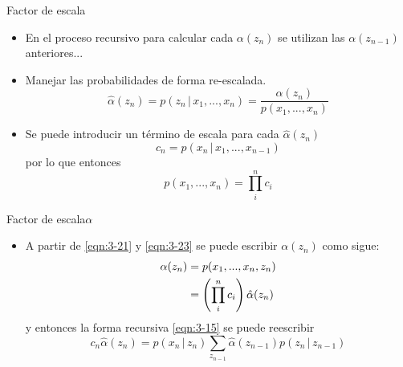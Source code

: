 \begin{frame}{Factor de escala}
  \begin{itemize}
    \itemsep1em

    \item En el proceso recursivo para calcular cada $\alpha(z_n)$ se utilizan las  $\alpha(z_{n-1})$ anteriores...

    \item Manejar las probabilidades de forma re-escalada.
      \begin{equation}
        \hat \alpha(z_n) = p(z_n \,|\, x_1, ..., x_n )
            = \frac{\alpha(z_n)}{p(x_1, ..., x_n)}
          \label{eqn:3-21}
      \end{equation}

    \item Se puede introducir un término de escala para cada $\hat \alpha(z_n)$
      \begin{equation}
        c_n = p(x_n \,|\, x_1, ..., x_{n-1})
        \label{eqn:3-22}
      \end{equation}
    por lo que entonces
      \begin{equation}
        p(x_1, ..., x_n) = \prod_i^n c_i 
        \label{eqn:3-23}
      \end{equation}
  \end{itemize}
\end{frame}

\begin{frame}{Factor de escala}{$\alpha$}
  \begin{itemize}
    \itemsep1em    
    \item A partir de \eqref{eqn:3-21} y \eqref{eqn:3-23} se puede escribir $\alpha(z_n)$ como sigue: 
    \begin{align}
      \alpha(z_n) &= p(x_1, ..., x_n, z_n) \notag \\
        &= \left( \prod_i^n c_i \right) \hat \alpha(z_n)    
      \label{eqn:3-24}
    \end{align}
  y entonces la forma recursiva \eqref{eqn:3-15} se puede reescribir
    \begin{equation}
      c_n \hat \alpha(z_n) = p(x_n \,|\, z_n) \sum_{z_{n-1}} 
        \hat \alpha(z_{n-1}) p(z_n \,|\, z_{n-1})
        \label{eqn:3-25}
    \end{equation}
  \end{itemize}
\end{frame}

